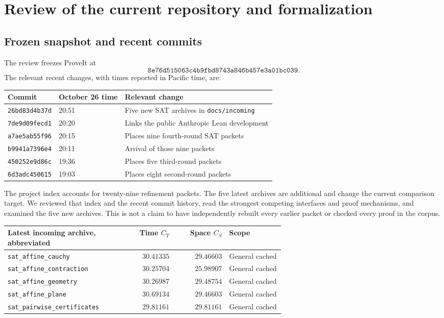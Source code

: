 \section{Review of the current repository and formalization}\label{sec:review}

\subsection{Frozen snapshot and recent commits}

The review freezes ProveIt at
\[
 \texttt{8e76d515063c4b9fbd8743a846b457e3a01bc039}.
\]
The relevant recent changes, with times reported in Pacific time, are:

\begin{center}\small
\begin{tabular}{@{}lll@{}}
\toprule
Commit & October 26 time & Relevant change\\
\midrule
\texttt{26bd83d4b37d} & 20:51 & Five new SAT archives in \texttt{docs/incoming}\\
\texttt{7de9d09fecd1} & 20:20 & Links the public Anthropic Lean development\\
\texttt{a7ae5ab55f96} & 20:15 & Places nine fourth-round SAT packets\\
\texttt{b9941a7396e4} & 20:11 & Arrival of those nine packets\\
\texttt{450252e9d86c} & 19:36 & Places five third-round packets\\
\texttt{6d3adc450615} & 19:03 & Places eight second-round packets\\
\bottomrule
\end{tabular}
\end{center}

The project index accounts for twenty-nine refinement packets. The five
latest archives are additional and change the current comparison target.
We reviewed that index and the recent commit history, read the strongest
competing interfaces and proof mechanisms, and examined the five new
archives. This is not a claim to have independently rebuilt every earlier
packet or checked every proof in the corpus.

\begin{center}\small
\begin{tabular}{@{}p{0.43\linewidth}rrp{0.20\linewidth}@{}}
\toprule
Latest incoming archive, abbreviated & Time \(C_T\) & Space \(C_S\) & Scope\\
\midrule
\texttt{sat\_affine\_cauchy} & \(30.41335\) & \(29.46603\) & General cached\\
\texttt{sat\_affine\_contraction} & \(30.25704\) & \(25.98907\) & General cached\\
\texttt{sat\_affine\_geometry} & \(30.26987\) & \(29.48754\) & General cached\\
\texttt{sat\_affine\_plane} & \(30.69134\) & \(29.46603\) & General cached\\
\texttt{sat\_pairwise\_certificates} & \(29.81161\) & \(29.81161\) & General cached\\
\bottomrule
\end{tabular}
\end{center}

